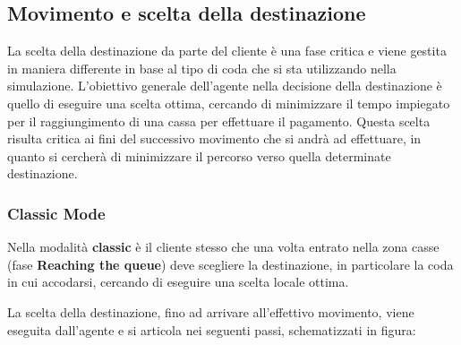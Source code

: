 \subsection{Movimento e scelta della destinazione}

La scelta della destinazione da parte del cliente è una fase critica e viene gestita in maniera differente in base al tipo di coda che si sta utilizzando nella simulazione. L'obiettivo generale dell'agente nella decisione della destinazione è quello di eseguire una scelta ottima, cercando di minimizzare il tempo impiegato per il raggiungimento di una cassa per effettuare il pagamento. 
Questa scelta risulta critica ai fini del successivo movimento che si andrà ad effettuare, in quanto si cercherà di minimizzare il percorso verso quella determinate destinazione.

\subsubsection*{Classic Mode}

Nella modalità \textbf{classic} è il cliente stesso che una volta entrato nella zona casse (fase \textbf{Reaching the queue}) deve scegliere la destinazione, in particolare la coda in cui accodarsi, cercando di eseguire una scelta locale ottima. 

La scelta della destinazione, fino ad arrivare all'effettivo movimento, viene eseguita dall'agente e si articola nei seguenti passi, schematizzati in figura:

